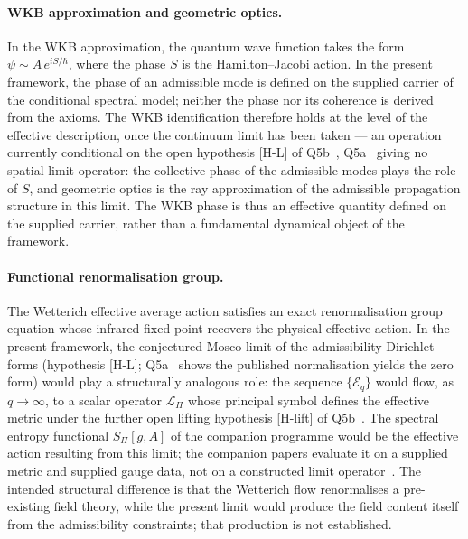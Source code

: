 \documentclass[11pt,a4paper]{article}
\begin{document}
  \paragraph{WKB approximation and geometric optics.}
    In the WKB approximation, the quantum wave function takes the form
    $\psi \sim A\,e^{iS/\hbar}$, where the phase $S$ is the Hamilton--Jacobi action.
    In the present framework, the phase of an admissible mode is defined on the supplied carrier of the
    conditional spectral model; neither the phase nor its coherence is derived from the axioms.
    The WKB identification therefore holds at the level of the effective description,
    once the continuum limit has been taken --- an operation currently conditional on
    the open hypothesis [H-L] of Q5b~\cite{Beau2026q5b}, Q5a~\cite{Beau2026q5a} giving no spatial
    limit operator: the collective
    phase of the admissible modes plays the role of $S$, and geometric optics is the
    ray approximation of the admissible propagation structure in this limit.
    The WKB phase is thus an effective quantity defined on the supplied carrier, rather than a fundamental
    dynamical object of the framework.

  \paragraph{Functional renormalisation group.}
    The Wetterich effective average action satisfies an exact renormalisation group
    equation whose infrared fixed point recovers the physical effective action.
    In the present framework, the conjectured Mosco limit of the admissibility
    Dirichlet forms (hypothesis [H-L]; Q5a~\cite{Beau2026q5a} shows the
    published normalisation yields the zero form) would play a structurally analogous
    role: the sequence $\{\mathcal{E}_q\}$ would flow, as $q\to\infty$, to a scalar
    operator $\mathcal{L}_\Pi$ whose principal symbol defines the effective metric under the further
    open lifting hypothesis [H-lift] of Q5b~\cite{Beau2026q5b}.
    The spectral entropy functional $S_\Pi[g,A]$ of the companion programme would be the
    effective action resulting from this limit; the companion papers evaluate it on a supplied metric and
    supplied gauge data, not on a constructed limit operator~\cite{Beau2026h,Beau2026q12,Beau2026q13}.
    The intended structural difference is that the Wetterich flow renormalises a pre-existing field
    theory, while the present limit would produce the field content itself from the admissibility
    constraints; that production is not established.
\end{document}
